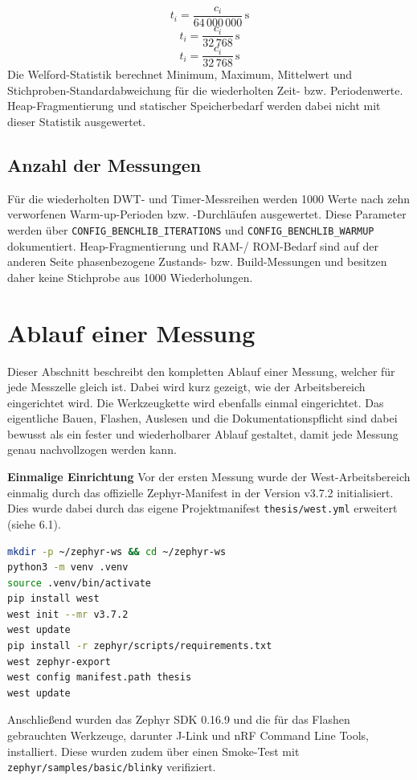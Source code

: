 \[t_i = \frac{c_i}{64\,000\,000}\,\mathrm{s}\]
\[t_i = \frac{c_i}{32\,768}\,\mathrm{s}\]
\[t_i = \frac{c_i}{32\,768}\,\mathrm{s}\]
Die Welford-Statistik berechnet Minimum, Maximum, Mittelwert und Stichproben-Standardabweichung für die wiederholten Zeit- bzw. Periodenwerte. Heap-Fragmentierung und statischer Speicherbedarf werden dabei nicht mit dieser Statistik ausgewertet.

\subsection{Anzahl der Messungen}
Für die wiederholten DWT- und Timer-Messreihen werden 1000 Werte nach zehn verworfenen Warm-up-Perioden bzw. -Durchläufen ausgewertet. Diese Parameter werden über \lstinline[style=fileinline]|CONFIG_BENCHLIB_ITERATIONS| und \lstinline[style=fileinline]|CONFIG_BENCHLIB_WARMUP| dokumentiert. Heap-Fragmentierung und RAM-/ ROM-Bedarf sind auf der anderen Seite phasenbezogene Zustands- bzw. Build-Messungen und besitzen daher keine Stichprobe aus 1000 Wiederholungen.

\section{Ablauf einer Messung}
Dieser Abschnitt beschreibt den kompletten Ablauf einer Messung, welcher für jede Messzelle gleich ist. Dabei wird kurz gezeigt, wie der Arbeitsbereich eingerichtet wird. Die Werkzeugkette wird ebenfalls einmal eingerichtet. Das eigentliche Bauen, Flashen, Auslesen und die Dokumentationspflicht sind dabei bewusst als ein fester und wiederholbarer Ablauf gestaltet, damit jede Messung genau nachvollzogen werden kann.

\textbf{Einmalige Einrichtung }Vor der ersten Messung wurde der West-Arbeitsbereich einmalig durch das offizielle Zephyr-Manifest in der Version v3.7.2 initialisiert. Dies wurde dabei durch das eigene Projektmanifest \lstinline[style=fileinline]|thesis/west.yml| erweitert (siehe 6.1).

\begin{lstlisting}[style=basecode,language=BAsh]
mkdir -p ~/zephyr-ws && cd ~/zephyr-ws
python3 -m venv .venv
source .venv/bin/activate
pip install west
west init --mr v3.7.2
west update
pip install -r zephyr/scripts/requirements.txt
west zephyr-export
west config manifest.path thesis
west update
\end{lstlisting}
Anschließend wurden das Zephyr SDK 0.16.9 und die für das Flashen gebrauchten Werkzeuge, darunter J-Link und nRF Command Line Tools, installiert. Diese wurden zudem über einen Smoke-Test mit \lstinline[style=fileinline]|zephyr/samples/basic/blinky| verifiziert.

